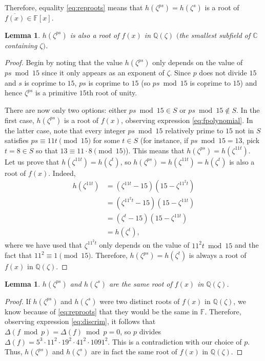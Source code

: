 \documentclass[a4paper, 12pt]{article}
\newtheorem{lemma}[theorem]{Lemma}
\theoremstyle{definition}
\newcommand{\Q}{\ensuremath{\mathbb{Q}}}
\newcommand{\C}{\ensuremath{\mathbb{C}}}
\newcommand{\F}{\ensuremath{\mathbb{F}}}
\begin{document}
Therefore, equality \eqref{eq:reproots} means that $h(\zeta^{ps})=h(\zeta^{s})$ is a root of $\overline{f(x)}\in\F[x]$. 

\begin{lemma}
$h(\zeta^{ps})$ is also a root of $f(x)$ in $\Q(\zeta)$ $($the smallest subfield of $\C$ containing $\zeta)$.
\end{lemma}
\begin{proof}
Begin by noting that the value $h(\zeta^{ps})$ only depends on the value of $ps \bmod{15}$ since it only appears as an exponent of $\zeta$. Since $p$ does not divide $15$ and $s$ is coprime to $15$, $ps$ is coprime to $15$ (so $ps \bmod{15}$ is coprime to $15$) and hence $\zeta^{ps}$ is a primitive $15$th root of unity.

There are now only two options: either $ps \bmod{15}\in S$ or $ps \bmod{15}\notin S$. In the first case, $h(\zeta^{ps})$ is a root of $f(x)$, observing expression \eqref{eq:fpolynomial}. In the latter case, note that every integer $ps \bmod{15}$ relatively prime to $15$ not in $S$ satisfies $ps\equiv 11t\pmod{15}$ for some $t\in S$ (for instance, if $ps \bmod{15}=13$, pick $t=8\in S$ so that $13\equiv 11\cdot8 \pmod{15}$). This means that $h(\zeta^{ps})=h(\zeta^{11t})$. Let us prove that $h(\zeta^{11t})=h(\zeta^{t})$, so $h(\zeta^{ps})=h(\zeta^{11t})=h(\zeta^{t})$ is also a root of $f(x)$. Indeed,
\begin{align*}
h(\zeta^{11t})&=(\zeta^{11t}-15)(15-\zeta^{11^2t})\\
&=(\zeta^{11^2t}-15)(15-\zeta^{11t})\\
&=(\zeta^{t}-15)(15-\zeta^{11t})\\
&=h(\zeta^{t}),
\end{align*}
where we have used that $\zeta^{11^2t}$ only depends on the value of $11^2t \bmod{15}$ and the fact that $11^2\equiv 1\pmod{15}$. Therefore, $h(\zeta^{ps})=h(\zeta^{t})$ is always a root of $f(x)$ in $\Q(\zeta)$.
\end{proof}

\begin{lemma}
$h(\zeta^{ps})$ and $h(\zeta^{s})$ are the same root of $f(x)$ in $\Q(\zeta)$.
\end{lemma}
\begin{proof}
If $h(\zeta^{ps})$ and $h(\zeta^{s})$ were two distinct roots of $f(x)$ in $\Q(\zeta)$, we know because of \eqref{eq:reproots} that they would be the same in $\F$. Therefore, observing expression \eqref{eq:discrim}, it follows that $\Delta(f \bmod{p})=\Delta(f) \bmod{p}=0$, so $p$ divides $\Delta(f)=5^{3} \cdot 11^{2} \cdot 19^{2} \cdot 41^{2} \cdot 1091^{2}$. This is a contradiction with our choice of $p$. Thus, $h(\zeta^{ps})$ and $h(\zeta^{s})$ are in fact the same root of $f(x)$ in $\Q(\zeta)$.
\end{proof}
\end{document}

